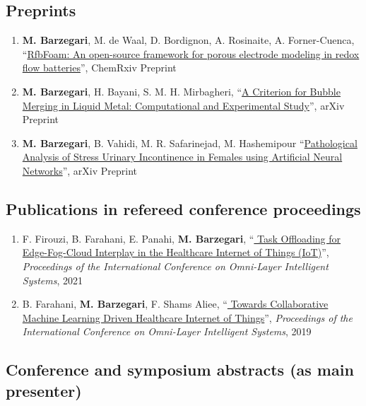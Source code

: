 \documentclass{cv}
\begin{document}
\subsection{Preprints}
\begin{enumerate}[itemsep=-0.2ex]
\item
\textbf{M. Barzegari}, M. de Waal, D. Bordignon, A. Rosinaite, A. Forner-Cuenca, ``\href{https://doi.org/10.26434/chemrxiv.10001658/v1}{RfbFoam: An open-source framework for porous electrode modeling in redox flow batteries}'', ChemRxiv Preprint
\item
\textbf{M. Barzegari}, H. Bayani, S. M. H. Mirbagheri, ``\href{https://arxiv.org/abs/1708.01608}{A Criterion for Bubble Merging in Liquid Metal: Computational and Experimental Study}'', arXiv Preprint
\item
\textbf{M. Barzegari}, B. Vahidi, M. R. Safarinejad, M. Hashemipour ``\href{https://arxiv.org/abs/1803.01843}{Pathological Analysis of Stress Urinary Incontinence in Females using Artificial Neural Networks}'', arXiv Preprint
\end{enumerate}

\subsection{Publications in refereed conference proceedings}
\begin{enumerate}[itemsep=-0.2ex]
\item
F. Firouzi, B. Farahani, E. Panahi, \textbf{M. Barzegari}, ``\href{https://ieeexplore.ieee.org/abstract/document/9524098}{
Task Offloading for Edge-Fog-Cloud Interplay in the Healthcare Internet of Things (IoT)}'', \textit{Proceedings of the International Conference on Omni-Layer Intelligent Systems}, 2021
\item
B. Farahani, \textbf{M. Barzegari}, F. Shams Aliee, ``\href{https://dl.acm.org/citation.cfm?id=3312644}{
Towards Collaborative Machine Learning Driven Healthcare Internet of Things}'', \textit{Proceedings of the International Conference on Omni-Layer Intelligent Systems}, 2019 
\end{enumerate}

\subsection{Conference and symposium abstracts (as main presenter)}
\end{document}
